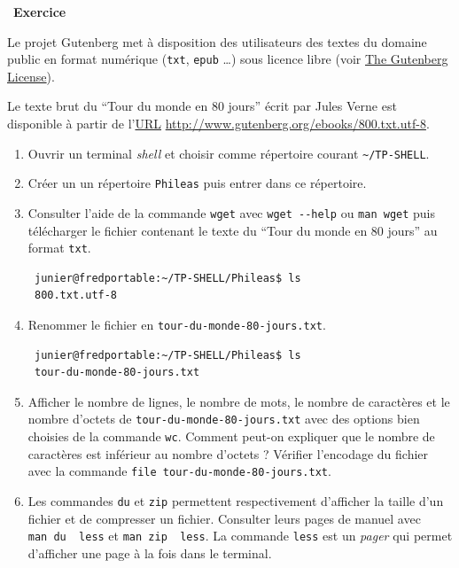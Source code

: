 \documentclass[
  11pt,
]{article}
\newcounter{exo}
\newenvironment{exercice}[1]
{\par \medskip   \addtocounter{exo}{1} \noindent  
\begin{bclogo}[arrondi =0.1,   noborder = true, logo=\bccrayon, marge=4]{~\textbf{Exercice} \textbf{\theexo} {\itshape #1} }  \par}
{
\end{bclogo}
 \par \bigskip }
\newcounter{def}
\begin{document}
\begin{exercice}{}

Le projet Gutenberg met à disposition des utilisateurs des textes du
domaine public en format numérique (\texttt{txt}, \texttt{epub}
\ldots{}) sous licence libre (voir
\href{https://www.gutenberg.org/wiki/Gutenberg:The_Project_Gutenberg_License}{The
Gutenberg License}).

Le texte brut du ``Tour du monde en 80 jours'' écrit par Jules Verne est
disponible à partir de
l'\href{https://fr.wikipedia.org/wiki/Uniform_Resource_Locator}{URL}
\url{http://www.gutenberg.org/ebooks/800.txt.utf-8}.

\begin{enumerate}
\def\labelenumi{\arabic{enumi}.}
\item
  Ouvrir un terminal \emph{shell} et choisir comme répertoire courant
  \texttt{\textasciitilde{}/TP-SHELL}.
\item
  Créer un un répertoire \texttt{Phileas} puis entrer dans ce
  répertoire.
\item
  Consulter l'aide de la commande \texttt{wget} avec
  \texttt{wget\ -\/-help} ou \texttt{man\ wget} puis télécharger le
  fichier contenant le texte du ``Tour du monde en 80 jours'' au format
  \texttt{txt}.

\begin{verbatim}
 junier@fredportable:~/TP-SHELL/Phileas$ ls
 800.txt.utf-8
\end{verbatim}
\item
  Renommer le fichier en \texttt{tour-du-monde-80-jours.txt}.

\begin{verbatim}
 junier@fredportable:~/TP-SHELL/Phileas$ ls
 tour-du-monde-80-jours.txt
\end{verbatim}
\item
  Afficher le nombre de lignes, le nombre de mots, le nombre de
  caractères et le nombre d'octets de
  \texttt{tour-du-monde-80-jours.txt} avec des options bien choisies de
  la commande \texttt{wc}. Comment peut-on expliquer que le nombre de
  caractères est inférieur au nombre d'octets ? Vérifier l'encodage du
  fichier avec la commande \texttt{file\ tour-du-monde-80-jours.txt}.
\item
  Les commandes \texttt{du} et \texttt{zip} permettent respectivement
  d'afficher la taille d'un fichier et de compresser un fichier.
  Consulter leurs pages de manuel avec
  \texttt{man\ du\ \textbar{}\ less} et
  \texttt{man\ zip\ \textbar{}~less}. La commande \texttt{less} est un
  \emph{pager} qui permet d'afficher une page à la fois dans le
  terminal.
\end{enumerate}


\end{exercice}
\end{document}
